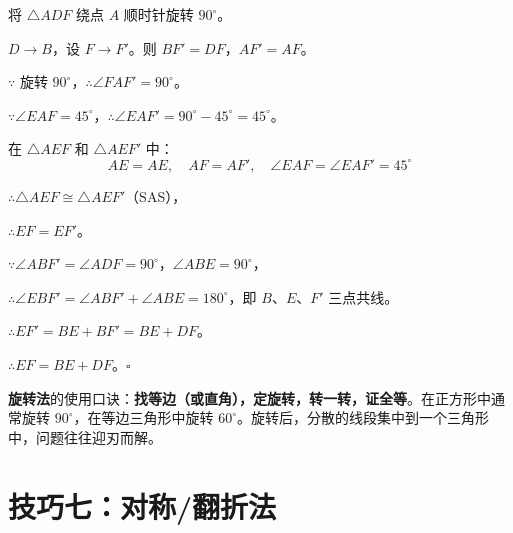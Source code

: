 \documentclass[12pt, a4paper]{ctexart}
\begin{document}
将 \(\triangle ADF\) 绕点 \(A\) 顺时针旋转 \(90^\circ\)。

\(D \to B\)，设 \(F \to F'\)。则 \(BF' = DF\)，\(AF' = AF\)。

\(\because\) 旋转 \(90^\circ\)，\(\therefore \angle FAF' = 90^\circ\)。

\(\because \angle EAF = 45^\circ\)，\(\therefore \angle EAF' = 90^\circ - 45^\circ = 45^\circ\)。

在 \(\triangle AEF\) 和 \(\triangle AEF'\) 中：
\[AE = AE, \quad AF = AF', \quad \angle EAF = \angle EAF' = 45^\circ\]

\(\therefore \triangle AEF \cong \triangle AEF'\)（SAS），

\(\therefore EF = EF'\)。

\(\because \angle ABF' = \angle ADF = 90^\circ\)，\(\angle ABE = 90^\circ\)，

\(\therefore \angle EBF' = \angle ABF' + \angle ABE = 180^\circ\)，即 \(B\)、\(E\)、\(F'\) 三点共线。

\(\therefore EF' = BE + BF' = BE + DF\)。

\(\therefore EF = BE + DF\)。\hfill\(\square\)

\begin{tipbox}[方法总结]
\textbf{旋转法}的使用口诀：\textbf{找等边（或直角），定旋转，转一转，证全等}。在正方形中通常旋转 \(90^\circ\)，在等边三角形中旋转 \(60^\circ\)。旋转后，分散的线段集中到一个三角形中，问题往往迎刃而解。
\end{tipbox}

\section*{\textcolor{mainblue}{技巧七：对称/翻折法}}
\end{document}
